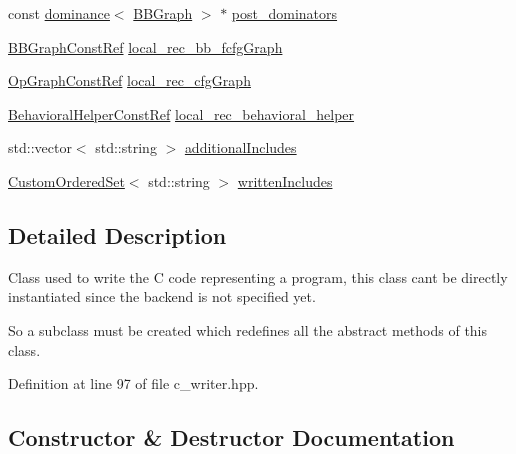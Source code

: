 \begin{DoxyCompactItemize}
\item 
const \hyperlink{classdominance}{dominance}$<$ \hyperlink{structBBGraph}{B\+B\+Graph} $>$ $\ast$ \hyperlink{classCWriter_a40593fe1329f1864c57b777b5fb7e3df}{post\+\_\+dominators}
\item 
\hyperlink{basic__block_8hpp_ab66bdbde3a29e41d079d8a320af9c921}{B\+B\+Graph\+Const\+Ref} \hyperlink{classCWriter_a7066b65a022f2629ebf99da65b9cbcdb}{local\+\_\+rec\+\_\+bb\+\_\+fcfg\+Graph}
\item 
\hyperlink{op__graph_8hpp_a9a0b240622c47584bee6951a6f5de746}{Op\+Graph\+Const\+Ref} \hyperlink{classCWriter_abefcc76b6c076a54de2e1a90d7fb54f1}{local\+\_\+rec\+\_\+cfg\+Graph}
\item 
\hyperlink{behavioral__helper_8hpp_aae973b54cac87eef3b27442aa3e1e425}{Behavioral\+Helper\+Const\+Ref} \hyperlink{classCWriter_a5bbe68dac066fd15c07a12e30b3da38a}{local\+\_\+rec\+\_\+behavioral\+\_\+helper}
\item 
std\+::vector$<$ std\+::string $>$ \hyperlink{classCWriter_a13c76532724ccd44bc1c86fb9de7317f}{additional\+Includes}
\item 
\hyperlink{classCustomOrderedSet}{Custom\+Ordered\+Set}$<$ std\+::string $>$ \hyperlink{classCWriter_a91e5847cc31c900423dce81b131992ea}{written\+Includes}
\end{DoxyCompactItemize}


\subsection{Detailed Description}
Class used to write the C code representing a program, this class can\textquotesingle{}t be directly instantiated since the backend is not specified yet. 

So a subclass must be created which redefines all the abstract methods of this class. 

Definition at line 97 of file c\+\_\+writer.\+hpp.



\subsection{Constructor \& Destructor Documentation}
\mbox{\label{classCWriter_a22480a6c6f4c3b3bbb3efb886b5a724c}} 
